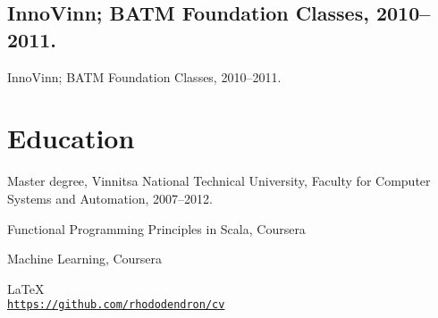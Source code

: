 \documentclass[letterpaper]{article}
\def\footerlink{https://github.com/rhododendron/cv}
\renewenvironment{itemize}{
  \begin{list}{}{
    \setlength{\leftmargin}{1.5em}
  }
}{
  \end{list}
}
\begin{document}
\subsection*{InnoVinn; BATM Foundation Classes, 2010--2011.}

\begin{itemize}
\item InnoVinn; BATM Foundation Classes, 2010--2011.
\end{itemize}

\section*{Education}

\begin{itemize}
  \item Master degree, Vinnitsa National Technical University, Faculty for Computer 
Systems and Automation, 2007--2012.
  \item Functional Programming Principles in Scala, Coursera
  \item Machine Learning, Coursera
\end{itemize}

\bigskip

\begin{center}
  \begin{footnotesize}
    \LaTeX \\
    \href{\footerlink}{\texttt{\footerlink}}
  \end{footnotesize}
\end{center}
\end{document}
